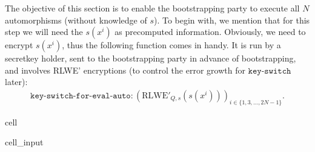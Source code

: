 \documentclass[letterpaper,10pt,english]{jupyterBook}
\begin{document}
\sphinxAtStartPar
The objective of this section is to enable the bootstrapping party to execute all \(N\) automorphisms (without knowledge of \(s\)).
To begin with, we mention that for this step we will need the \(s(x^i)\) as pre\sphinxhyphen{}computed information.
Obviously, we need to encrypt \(s(x^i)\), thus the following function comes in handy.
It is run by a secret\sphinxhyphen{}key holder, sent to the bootstrapping party in advance of bootstrapping, and involves RLWE’ encryptions (to control the error growth for \(\texttt{key-switch}\) later):
\begin{equation*}
\begin{split}\texttt{key-switch-for-eval-auto}: (\mathrm{RLWE'}_{Q,s}(s(x^i)))_{i\in \{1,3,\dots,2N-1\}}.\end{split}
\end{equation*}
\begin{sphinxuseclass}{cell}\begin{sphinxVerbatimInput}

\begin{sphinxuseclass}{cell_input}
\begin{sphinxVerbatim}[commandchars=\\\{\}]
    
             
     \PYG{p}{[}\PYG{p}{[}     \PYG{p}{]}      \PYG{p}{]}
\end{sphinxVerbatim}

\end{sphinxuseclass}\end{sphinxVerbatimInput}

\end{sphinxuseclass}
\end{document}
